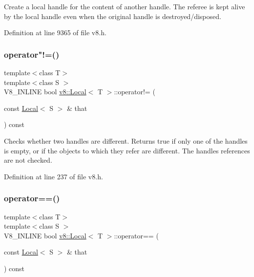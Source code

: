 Create a local handle for the content of another handle. The referee is kept alive by the local handle even when the original handle is destroyed/disposed. 

Definition at line 9365 of file v8.\+h.

\mbox{\label{classv8_1_1Local_a3b2ae1c0415d319099ebc2fd059dbb10}} 
\subsubsection{\texorpdfstring{operator"!=()}{operator!=()}}
{\footnotesize\ttfamily template$<$class T$>$ \\
template$<$class S $>$ \\
V8\+\_\+\+I\+N\+L\+I\+NE bool \mbox{\hyperlink{classv8_1_1Local}{v8\+::\+Local}}$<$ T $>$\+::operator!= (\begin{DoxyParamCaption}\item[{const \mbox{\hyperlink{classv8_1_1Local}{Local}}$<$ S $>$ \&}]{that }\end{DoxyParamCaption}) const\hspace{0.3cm}{\ttfamily [inline]}}

Checks whether two handles are different. Returns true if only one of the handles is empty, or if the objects to which they refer are different. The handles\textquotesingle{} references are not checked. 

Definition at line 237 of file v8.\+h.

\mbox{\label{classv8_1_1Local_a0dfaa25015487674f568a4e1cd0be48c}} 
\subsubsection{\texorpdfstring{operator==()}{operator==()}}
{\footnotesize\ttfamily template$<$class T$>$ \\
template$<$class S $>$ \\
V8\+\_\+\+I\+N\+L\+I\+NE bool \mbox{\hyperlink{classv8_1_1Local}{v8\+::\+Local}}$<$ T $>$\+::operator== (\begin{DoxyParamCaption}\item[{const \mbox{\hyperlink{classv8_1_1Local}{Local}}$<$ S $>$ \&}]{that }\end{DoxyParamCaption}) const\hspace{0.3cm}{\ttfamily [inline]}}

